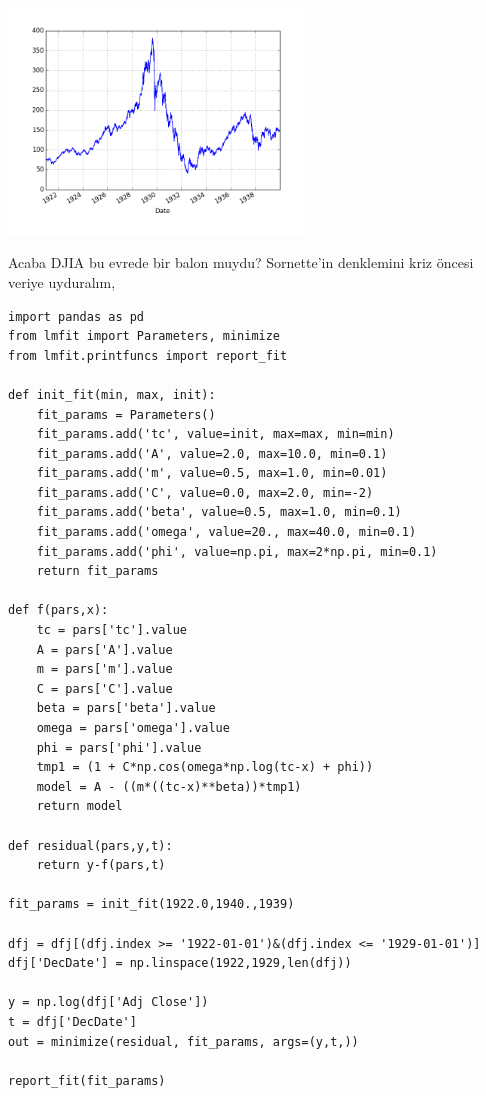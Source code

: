 \documentclass[12pt,fleqn]{article}\usepackage{../../common}
\begin{document}
\includegraphics[height=6cm]{tser_bubble_01.png}

Acaba DJIA bu evrede bir balon muydu?  Sornette'in denklemini kriz öncesi
veriye uyduralım,

\begin{verbatim}
import pandas as pd
from lmfit import Parameters, minimize
from lmfit.printfuncs import report_fit

def init_fit(min, max, init):
    fit_params = Parameters()
    fit_params.add('tc', value=init, max=max, min=min)
    fit_params.add('A', value=2.0, max=10.0, min=0.1)
    fit_params.add('m', value=0.5, max=1.0, min=0.01)
    fit_params.add('C', value=0.0, max=2.0, min=-2)
    fit_params.add('beta', value=0.5, max=1.0, min=0.1)
    fit_params.add('omega', value=20., max=40.0, min=0.1)
    fit_params.add('phi', value=np.pi, max=2*np.pi, min=0.1)
    return fit_params

def f(pars,x):
    tc = pars['tc'].value
    A = pars['A'].value
    m = pars['m'].value
    C = pars['C'].value
    beta = pars['beta'].value
    omega = pars['omega'].value
    phi = pars['phi'].value
    tmp1 = (1 + C*np.cos(omega*np.log(tc-x) + phi))
    model = A - ((m*((tc-x)**beta))*tmp1)
    return model
    
def residual(pars,y,t):
    return y-f(pars,t)

fit_params = init_fit(1922.0,1940.,1939)

dfj = dfj[(dfj.index >= '1922-01-01')&(dfj.index <= '1929-01-01')]
dfj['DecDate'] = np.linspace(1922,1929,len(dfj))

y = np.log(dfj['Adj Close'])
t = dfj['DecDate']
out = minimize(residual, fit_params, args=(y,t,))

report_fit(fit_params)
\end{verbatim}
\end{document}
